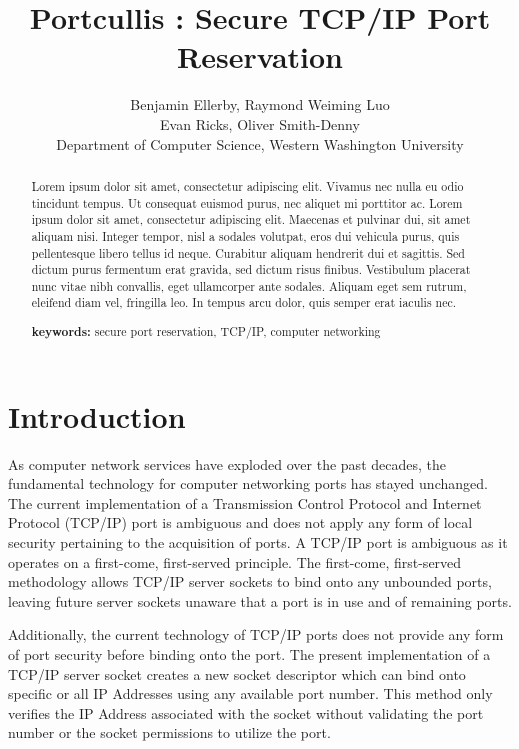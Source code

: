 \documentclass{sig-alternate}
\title{Portcullis : Secure TCP/IP Port Reservation}
\author{Benjamin Ellerby, Raymond Weiming Luo\\ 
Evan Ricks, Oliver Smith-Denny\\
Department of Computer Science, Western Washington University}
\begin{document}
\maketitle
\thispagestyle{firstpage}
\pagestyle{plain}

\begin{abstract}
Lorem ipsum dolor sit amet, consectetur adipiscing elit. Vivamus nec nulla eu odio tincidunt tempus. Ut consequat euismod purus, nec aliquet mi porttitor ac. Lorem ipsum dolor sit amet, consectetur adipiscing elit. Maecenas et pulvinar dui, sit amet aliquam nisi. Integer tempor, nisl a sodales volutpat, eros dui vehicula purus, quis pellentesque libero tellus id neque. Curabitur aliquam hendrerit dui et sagittis. Sed dictum purus fermentum erat gravida, sed dictum risus finibus. Vestibulum placerat nunc vitae nibh convallis, eget ullamcorper ante sodales. Aliquam eget sem rutrum, eleifend diam vel, fringilla leo. In tempus arcu dolor, quis semper erat iaculis nec.

\textbf{keywords:} secure port reservation, TCP/IP, computer networking
\end{abstract}

\section{Introduction}
As computer network services have exploded over the past decades, the fundamental technology for computer networking ports has stayed unchanged. The current implementation of a Transmission Control Protocol and Internet Protocol (TCP/IP) port is ambiguous and does not apply any form of local security pertaining to the acquisition of ports. A TCP/IP port is ambiguous as it operates on a first-come, first-served principle. The first-come, first-served methodology allows TCP/IP server sockets to bind onto any unbounded ports, leaving future server sockets unaware that a port is in use and of remaining ports.

Additionally, the current technology of TCP/IP ports does not provide any form of port security before binding onto the port. The present implementation of a TCP/IP server socket creates a new socket descriptor which can bind onto specific or all IP Addresses using any available port number. This method only verifies the IP Address associated with the socket without validating the port number or the socket permissions to utilize the port. 
\end{document}
